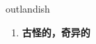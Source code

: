 
\begin{frame}
{\huge outlandish}
\begin{center}
\begin{enumerate}\Large
  \item \textbf{古怪的，奇异的}
\end{enumerate}
\end{center}
\end{frame}
